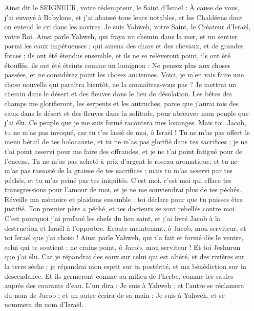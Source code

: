 \begin{multicols}{2}
Ainsi dit le SEIGNEUR, votre rédempteur, le Saint d'Israël : À cause de vous, j'ai envoyé à Babylone, et j'ai abaissé tous leurs notables, et les Chaldéens dont on entend le cri dans les navires.
Je suis Yahweh, votre Saint, le Créateur d'Israël, votre Roi.
Ainsi parle Yahweh, qui fraya un chemin dans la mer, et un sentier parmi les eaux impétueuses ;
qui amena des chars et des chevaux, et de grandes forces ; ils ont été étendus ensemble, et ils ne se relèveront point, ils ont été étouffés, ils ont été éteints comme un lumignon :
Ne pensez plus aux choses passées, et ne considérez point les choses anciennes.
Voici, je m'en vais faire une chose nouvelle qui paraîtra bientôt, ne la connaîtrez-vous pas ? Je mettrai un chemin dans le désert et des fleuves dans le lieu de désolation.
Les bêtes des champs me glorifieront, les serpents et les autruches, parce que j'aurai mis des eaux dans le désert et des fleuves dans la solitude, pour abreuver mon peuple que j'ai élu.
Ce peuple que je me suis formé racontera mes louanges.
Mais toi, Jacob, tu ne m'as pas invoqué, car tu t'es lassé de moi, ô Israël !
Tu ne m'as pas offert le menu bétail de tes holocauste, et tu ne m'as pas glorifié dans tes sacrifices ; je ne t'ai point asservi pour me faire des offrandes, et je ne t'ai point fatigué pour de l'encens.
Tu ne m'as pas acheté à prix d'argent le roseau aromatique, et tu ne m'as pas rassasié de la graisse de tes sacrifices ; mais tu m'as asservi par tes péchés, et tu m'as peiné par tes iniquités.
C'est moi, c'est moi qui efface tes transgressions pour l'amour de moi, et je ne me souviendrai plus de tes péchés.
Réveille ma mémoire et plaidons ensemble ; toi déclare pour que tu puisses être justifié.
Ton premier père a péché, et tes docteurs se sont rebellés contre moi.
C'est pourquoi j'ai profané les chefs du lieu saint, et j'ai livré Jacob à la destruction et Israël à l'opprobre.
\VerseOne{}Ecoute maintenant, ô Jacob, mon serviteur, et toi Israël que j'ai choisi !
Ainsi parle Yahweh, qui t'a fait et formé dès le ventre, celui qui te soutient ; ne crains point, ô Jacob, mon serviteur ! Et toi Jeshurun que j'ai élu.
Car je répandrai des eaux sur celui qui est altéré, et des rivières sur la terre sèche ; je répandrai mon esprit sur ta postérité, et ma bénédiction sur ta descendance.
Et ils germeront comme au milieu de l'herbe, comme les saules auprès des courants d'eau.
L'un dira : Je suis à Yahweh ; et l'autre se réclamera du nom de Jacob ; et un autre écrira de sa main : Je suis à Yahweh, et se nommera du nom d'Israël.

\end{multicols}
